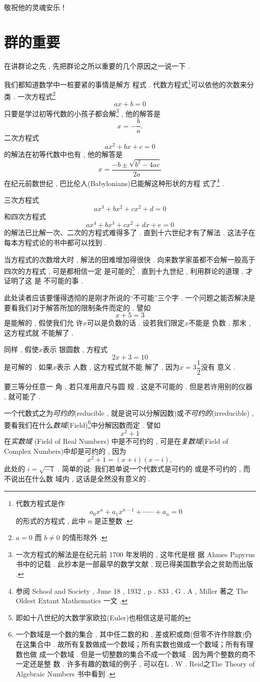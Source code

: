 敬祝他的灵魂安乐！

\section{群的重要}

在讲群论之先 , 先把群论之所以重要的几个原因之一说一下 . 

我们都知道数学中一桩要紧的事情是解方 程式 . 代数方程式\footnote{代数方程式是作
	\[
	a_{0} x^{n}+a_{1} x^{n-1}+\cdots \cdots+a_{n}=0
	\]
	的形式的方程式 , 此中 $n$ 是正整数 . }可以依他的次数来分类 . 一次方程式\footnote{$a=0$ 而 $b \neq 0$ 的情形除外 . }
\[
a x+b=0
\]
只要是学过初等代数的小孩子都会解\footnote{一次方程式的解法是在纪元前 1700 年发明的 ,  这年代是根 据 Ahmes Papyrus 书中的记载 . 此抄本是一部最早的数学文献 , 现已得美国数学会之贫助而出版 . } ,  他的解答是
\[
x=-\dfrac{b}{a} . 
\]
二次方程式
\[
a x^{2}+b x+c=0
\]
的解法在初等代数中也有 , 他的解答是
\[
x=\dfrac{-b \pm \sqrt{b^{2}-4 a c}}{2a}
\]
在纪元前数世纪 ,  巴比伦人(Babylonians)已能解这种形状的方程
式了\footnote{参阅 School and Society , June 18 , 1932 , p . 833 , G . A , Miller 著之 The Oldest Extant Mathematics 一文 . } . 

三次方程式
\[
a x^{3}+b x^{2}+c x^{2}+d=0
\]
和四次方程式
\[
a x^{4}+b x^{3}+c x^{2}+d x+e=0
\]
的解法已比解一次、二次的方程式难得多了 . 直到十六世纪才有了解法 . 这法子在每本方程式论的书中都可以找到 . 

当方程式的次数增大时 , 解法的田难增加得很快 . 向来数学家虽都不会解一般高于四次的方程式 , 可是都相信一定 是可能的\footnote{即如十八世纪的大数学家欧拉(Euler)也相信这是可能的} . 直到十九世纪 , 利用群论的道理 , 才证明了这 是 不可能的事 . 

此处读者应该要懂得透彻的是刚才所说的“不可能”三个字 . 一个问题之能否解决是要看我们对于解答所加的限制条件而定的 . 譬如
\[x+5=3\]
是能解的 , 假使我们允 许$x$可以是负数的话 . 设若我们限定$x$不能是 负数 , 那末 , 这方程式就 不能解了 . 

同样 , 假使$x$表示 银圆数 , 方程式
\[2x + 3=10\]
是可解的 . 如果$x$表示 人数 , 这方程式就不能 解了 , 因为$x=3\dfrac{1}{2}$没有 意义 . 

要三等分任意一 角 , 若只准用直尺与圆 规 , 这是不可能的 . 但是若许用别的仪器 , 就可能了 . 

一个代数式之为\emph{可约的}(reducible , 就是说可以分解因数)或\emph{不可约的}(irreducible) , 要看我们在什么\emph{数域}(Field)\footnote{一个数域是一个数的集合 , 其中任二数的和 , 差或积或商(但零不许作除数)仍 在这集合中 . 故所有复数做成一个数域；所有实数也做成一个数域；所有有理数也做 成一个数域 . 但是一切整数的集合不成一个数域 . 因为两个整数的商不一定还是整 数 . 许多有趣的数域的例子 , 可以在L . W . Reid之The Theory of Algebraic Numbers 书中看到 . }中分解因数而定 . 譬如
\[
x^{2}+1
\]
在\emph{实数域} (Field of Real Numbers) 中是不可约的 , 可是在\emph{复数域}(Field of Complex Numbers)中却是可约的 ,  因为
\[
x^{2}+1=(x+i)(x-i) , 
\]
此处的 $i=\sqrt{-1}$  . 简单的说: 我们若单说一个代数式是可约的 或是不可约的 , 而不说出在什么数 域内 , 这话是全然没有意义的 . 

